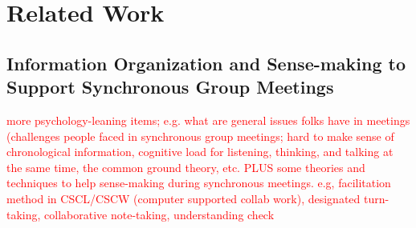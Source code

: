
\section{Related Work}

\subsection{Information Organization and Sense-making to Support Synchronous Group Meetings}

\textcolor{red}{more psychology-leaning items; e.g. what are general issues folks have in meetings (challenges people faced in synchronous group meetings; hard to make sense of chronological information, cognitive load for listening, thinking, and talking at the same time, the common ground theory, etc. PLUS some theories and techniques to help sense-making during synchronous meetings. e.g, facilitation method in CSCL/CSCW (computer supported collab work), designated turn-taking, collaborative note-taking, understanding check}

